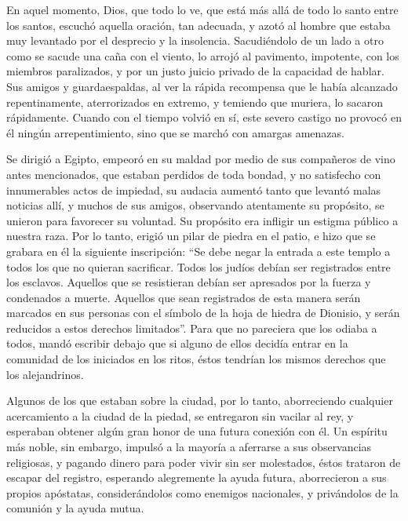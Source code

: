  En aquel momento, Dios, que todo lo ve, que está más
allá de todo lo santo entre los santos, escuchó aquella oración, tan
adecuada, y azotó al hombre que estaba muy levantado por el desprecio y
la insolencia.  Sacudiéndolo de un lado a otro como se
sacude una caña con el viento, lo arrojó al pavimento, impotente, con
los miembros paralizados, y por un justo juicio privado de la capacidad
de hablar.  Sus amigos y guardaespaldas, al ver la rápida
recompensa que le había alcanzado repentinamente, aterrorizados en
extremo, y temiendo que muriera, lo sacaron rápidamente. 
Cuando con el tiempo volvió en sí, este severo castigo no provocó en él
ningún arrepentimiento, sino que se marchó con amargas amenazas.

 Se dirigió a Egipto, empeoró en su maldad por medio de
sus compañeros de vino antes mencionados, que estaban perdidos de toda
bondad,  y no satisfecho con innumerables actos de
impiedad, su audacia aumentó tanto que levantó malas noticias allí, y
muchos de sus amigos, observando atentamente su propósito, se unieron
para favorecer su voluntad.  Su propósito era infligir un
estigma público a nuestra raza. Por lo tanto, erigió un pilar de piedra
en el patio, e hizo que se grabara en él la siguiente inscripción:
 ``Se debe negar la entrada a este templo a todos los que
no quieran sacrificar. Todos los judíos debían ser registrados entre los
esclavos. Aquellos que se resistieran debían ser apresados por la fuerza
y condenados a muerte.  Aquellos que sean registrados de
esta manera serán marcados en sus personas con el símbolo de la hoja de
hiedra de Dionisio, y serán reducidos a estos derechos limitados''.
 Para que no pareciera que los odiaba a todos, mandó
escribir debajo que si alguno de ellos decidía entrar en la comunidad de
los iniciados en los ritos, éstos tendrían los mismos derechos que los
alejandrinos.

 Algunos de los que estaban sobre la ciudad, por lo
tanto, aborreciendo cualquier acercamiento a la ciudad de la piedad, se
entregaron sin vacilar al rey, y esperaban obtener algún gran honor de
una futura conexión con él.  Un espíritu más noble, sin
embargo, impulsó a la mayoría a aferrarse a sus observancias religiosas,
y pagando dinero para poder vivir sin ser molestados, éstos trataron de
escapar del registro,  esperando alegremente la ayuda
futura, aborrecieron a sus propios apóstatas, considerándolos como
enemigos nacionales, y privándolos de la comunión y la ayuda mutua.

